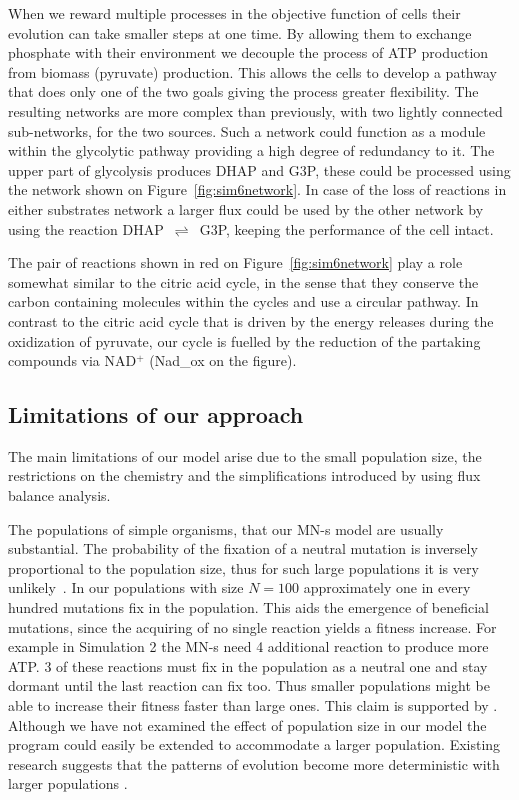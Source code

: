 \documentclass[a4paper,12pt]{article}
\begin{document}
When we reward multiple processes in the objective function of cells their evolution can take smaller steps at one time. By allowing them to exchange phosphate with their environment we decouple the process of ATP production from biomass (pyruvate) production. This allows the cells to develop a pathway that does only one of the two goals giving the process greater flexibility. The resulting networks are more complex than previously, with two lightly connected sub-networks, for the two sources. Such a network could function as a module within the glycolytic pathway providing a high degree of redundancy to it. The upper part of glycolysis produces DHAP and G3P, these could be processed using the network shown on Figure~\ref{fig:sim6network}. In case of the loss of reactions in either substrates network a larger flux could be used by the other network by using the reaction DHAP~$\rightleftharpoons$~G3P, keeping the performance of the cell intact. 

The pair of reactions shown in red on Figure~\ref{fig:sim6network} play a role somewhat similar to the 
citric acid cycle, in the sense that they conserve the carbon containing molecules within the cycles and use a circular pathway. In contrast to the citric acid cycle that is driven by the energy releases during the oxidization of pyruvate, our cycle is fuelled by the reduction of the partaking compounds via NAD$^+$ (Nad\_ox on the figure). 

\subsection{Limitations of our approach}
\label{sub:limitations}


The main limitations of our model arise due to the small population size, the restrictions on the chemistry and the simplifications introduced by using flux balance analysis. 

The populations of simple organisms, that our MN-s model are usually substantial. The probability of the fixation of a neutral mutation is inversely proportional to the population size, thus for such large populations it is very unlikely~\cite{barteklecture}. In our populations with size $N=100$ approximately one in every hundred mutations fix in the population. This aids the emergence of beneficial mutations, since the acquiring of no single reaction yields a fitness increase. For example in Simulation 2 the MN-s need 4 additional reaction to produce more ATP. $3$ of these reactions must fix in the population as a neutral one and stay dormant until the last reaction can fix too. Thus smaller populations might be able to increase their fitness faster than large ones. This claim is supported by \cite{smallpopulation}. 
Although we have not examined the effect of population size in our model the program could easily be extended to accommodate a larger population. Existing research suggests that the patterns of evolution become more deterministic with larger populations \cite{predictability}.
\end{document}
